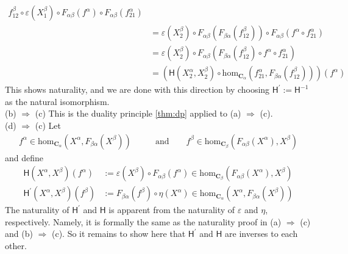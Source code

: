 \begin{prf}
\begin{align*}
  f_{12}^{\beta}
  \circ
  \varepsilon(X_{1}^{\beta})
  \circ
  F_{\alpha\beta}(f^{\alpha})
  \circ
  F_{\alpha\beta}(f_{21}^{\alpha})
  \\
  &=
  \varepsilon(X_{2}^{\beta})
  \circ
  F_{\alpha\beta}
  \left(
    F_{\beta\alpha}(f_{12}^{\beta})
  \right)
  \circ
  F_{\alpha\beta}(f^{\alpha} \circ f_{21}^{\alpha})
  \tag{NT}
  \\
  &=
  \varepsilon(X_{2}^{\beta})
  \circ
  F_{\alpha\beta}
  \left(
    F_{\beta\alpha}(f_{12}^{\beta})
    \circ
    f^{\alpha}
    \circ
    f_{21}^{\alpha}
  \right)
  \\
  &=
  \left(
    \mathsf{H}(X_{2}^{\alpha},X_{2}^{\beta})
    \circ
    \mathrm{hom}_{\mathbf{C}_{\alpha}}
    \left(
      f_{21}^{\alpha},
      F_{\beta\alpha}(f_{12}^{\beta})
    \right)
  \right)
  (f^{\alpha})
\end{align*}
This shows naturality, and we are done with this direction by choosing $\mathsf{H}^{\prime} := \mathsf{H}^{-1}$ as the natural isomorphism.
\\
{\glqq}(b) $\Rightarrow$ (c){\grqq}
\qquad
This is the duality principle \ref{thm:dp} applied to {\glqq}(a) $\Rightarrow$ (c){\grqq}.
\\
{\glqq}(d) $\Rightarrow$ (c){\grqq}
\qquad
Let
\begin{align*}
  f^{\alpha}
  \in
  \mathrm{hom}_{\mathbf{C}_{\alpha}}
  \left(
    X^{\alpha},
    F_{\beta\alpha}(X^{\beta})
  \right)
  \qquad
  &\text{and}
  \qquad
  f^{\beta}
  \in
  \mathrm{hom}_{\mathbf{C}_{\beta}}
  \left(
    F_{\alpha\beta}(X^{\alpha}),
    X^{\beta}
  \right)
\end{align*}
and define
\begin{align*}
  \mathsf{H}(X^{\alpha},X^{\beta})(f^{\alpha})
  &:=
  \varepsilon(X^{\beta})
  \circ
  F_{\alpha\beta}(f^{\alpha})
  \in
  \mathrm{hom}_{\mathbf{C}_{\beta}}
  \left(
    F_{\alpha\beta}(X^{\alpha}),
    X^{\beta}
  \right)
  \\
  \mathsf{H}^{\prime}(X^{\alpha},X^{\beta})(f^{\beta})
  &:=
  F_{\beta\alpha}(f^{\beta})
  \circ
  \eta(X^{\alpha})
  \in
  \mathrm{hom}_{\mathbf{C}_{\alpha}}
  \left(
    X^{\alpha},
    F_{\beta\alpha}(X^{\beta})
  \right)
\end{align*}
The naturality of $\mathsf{H}^{\prime}$ and $\mathsf{H}$ is apparent from the naturality of $\varepsilon$ and $\eta$, respectively.
Namely, it is formally the same as the naturality proof in {\glqq}(a) $\Rightarrow$ (c){\grqq} and {\glqq}(b) $\Rightarrow$ (c){\grqq}.
So it remains to show here that $\mathsf{H}^{\prime}$ and $\mathsf{H}$ are inverses to each other.

\end{prf}
